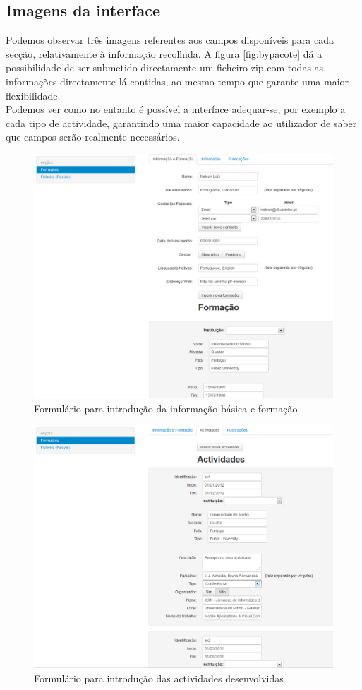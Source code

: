 \documentclass[a4paper,11pt,openright,openbib]{article}
\begin{document}
\subsection{Imagens da interface}
Podemos observar três imagens referentes aos campos disponíveis para cada secção, relativamente à informação recolhida. A figura \ref{fig:bypacote} dá a possibilidade de ser submetido directamente um ficheiro zip com todas as informações directamente lá contidas, ao mesmo tempo que garante uma maior flexibilidade.\\
Podemos ver como no entanto é possível a interface adequar-se, por exemplo a cada tipo de actividade, garantindo uma maior capacidade ao utilizador de saber que campos serão realmente necessários.
\begin{figure}[!ht]
\centering
\includegraphics[scale=0.6]{iInfo.png}
\caption{Formulário para introdução da informação básica e formação}
\label{fig:iinfo}
\end{figure}
\begin{figure}[!ht]
\centering
\includegraphics[scale=0.6]{iActivities.png}
\caption{Formulário para introdução das actividades desenvolvidas}
\label{fig:iActivities}
\end{figure}
\end{document}
